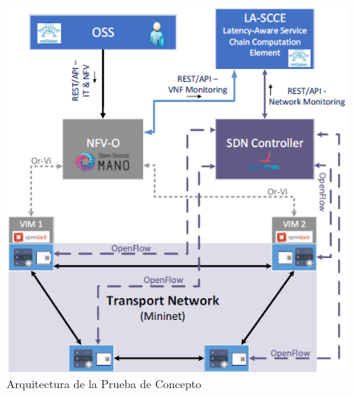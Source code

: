 \begin{figure}[!ht]
	\centering
	\includegraphics[width=0.7\linewidth]{imagenes/esquema_demo}
	\caption{Arquitectura de la Prueba de Concepto}
	\label{fig:esquemademo}
\end{figure}





